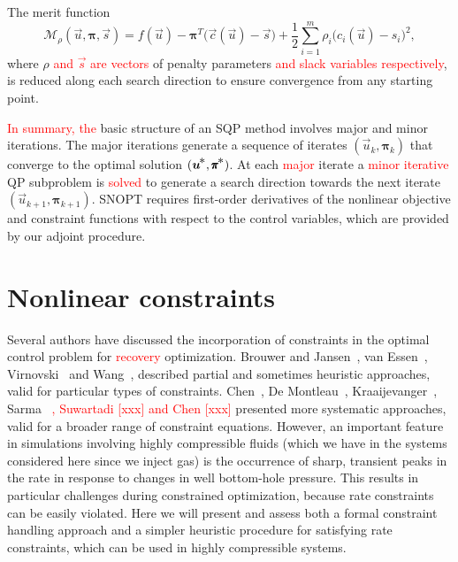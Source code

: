 \documentclass[twocolumn,numbook]{svjour3}          %
\newcommand{\red}[1]{\textcolor{red}{#1}}
\def\u{{\vec u}}
\def\c{{\vec c}}
\def\s{{\vec s}}
\def\bpi{{\pmb{\pi}}}%
\def\half  {{\textstyle{\frac12}}}
\def\kp#1{_{k+#1}}
\def\Mscr{{\mathcal M}}
\def\nthinsp{\mskip -2   mu}
\def\bpistar{\bpi\superstar}
\def\superstar{^{\raise 0.5pt\hbox{$\nthinsp *$}}}
\def\T{^T\!}
\def\ustar{\u\superstar}
\def\SNOPT {{\small SNOPT}}
\begin{document}
The merit function 
\begin{equation}                              \label{eqn-def-merit}
        \Mscr_\rho(\u,\bpi,\s)
          = f(\u) - \bpi\T \bigl( \c(\u) - \s \bigr)
            + \half \sum_{i=1}^m \rho_i\big( c_i(\u) - s_i\big)^2,
\end{equation}
where $\rho$ \red{and $\s$ are vectors} of penalty parameters \red{and slack variables respectively}, 
is reduced along each search
direction to ensure convergence from any starting point.

\red{In summary, the} basic structure of an SQP method involves major and
minor iterations.  The major iterations generate a sequence of
iterates $(\u_k,\bpi_k)$ that converge to the optimal solution $(\ustar,\bpistar)$.
At each \red{major} iterate a \red{minor iterative} QP subproblem is \red{solved} to generate a search direction
towards the next iterate $(\u\kp1,\bpi\kp1)$.
\SNOPT{} requires first-order derivatives of the nonlinear
objective and constraint functions with respect to the control variables, which
are provided by our adjoint procedure.



\section{Nonlinear constraints} \label{sec:constraints} 
Several authors have discussed the incorporation of constraints in the optimal
control problem for \red{recovery} optimization. Brouwer and 
Jansen~\cite{Brouwer:2004}, van Essen~\cite{VanEssen}, Virnovski~\cite{Virnovski} and
Wang~\cite{Wang:2009},
described partial and sometimes heuristic approaches, valid for
particular types of constraints. Chen~\cite{Chen:2010}, De Montleau~\cite{Montleau},
 Kraaijevanger~\cite{Kraaijevanger}, Sarma~\cite{Pallav:2006, Pallav:2008} \red{, Suwartadi [xxx] and Chen [xxx]}  
presented more systematic approaches, valid for a broader range of constraint equations. However, an important feature in simulations involving highly compressible fluids (which we have in the systems considered here since we inject gas) is the occurrence of sharp, transient peaks in the rate in response to changes in well bottom-hole pressure. This results in
particular challenges during constrained optimization, because rate constraints can be easily violated. Here we will present and assess both a formal constraint handling approach and a simpler heuristic procedure for satisfying rate constraints, which can be used in highly compressible systems.
\end{document}
